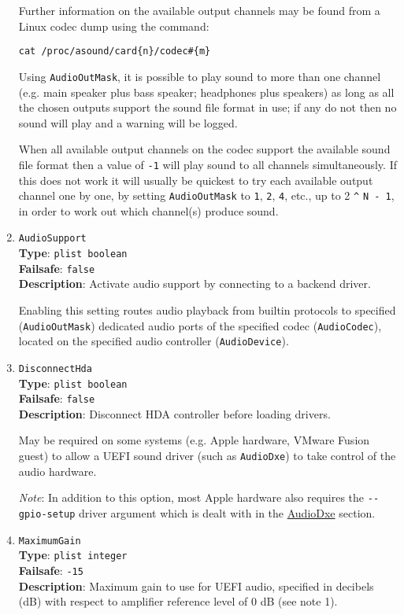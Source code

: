 \documentclass[]{article}
\begin{document}
\begin{enumerate}
  Further information on the available output channels may be found from a Linux codec dump using the command:
  
  \texttt{cat /proc/asound/card\{n\}/codec\#\{m\}}
  
  Using \texttt{AudioOutMask}, it is possible to play sound to more than one channel (e.g. main speaker plus bass speaker;
  headphones plus speakers) as long as all the chosen outputs support the sound file format in use; if any do not then no
  sound will play and a warning will be logged.

  When all available output channels on the codec support the available sound file format then a value
  of \texttt{-1} will play sound to all channels simultaneously. If this does not work it will usually be quickest
  to try each available output channel one by one, by setting \texttt{AudioOutMask} to \texttt{1}, \texttt{2},
  \texttt{4}, etc., up to 2 \texttt{\^{}} \texttt{N - 1}, in order to work out which channel(s) produce sound.

  \item
  \texttt{AudioSupport}\\
  \textbf{Type}: \texttt{plist\ boolean}\\
  \textbf{Failsafe}: \texttt{false}\\
  \textbf{Description}: Activate audio support by connecting to a backend driver.

  Enabling this setting routes audio playback from builtin protocols to specified
  (\texttt{AudioOutMask}) dedicated audio ports of the specified codec (\texttt{AudioCodec}),
  located on the specified audio controller (\texttt{AudioDevice}).

  \item
  \texttt{DisconnectHda}\\
  \textbf{Type}: \texttt{plist\ boolean}\\
  \textbf{Failsafe}: \texttt{false}\\
  \textbf{Description}: Disconnect HDA controller before loading drivers.

  May be required on some systems (e.g. Apple hardware, VMware Fusion guest) to allow
  a UEFI sound driver (such as \texttt{AudioDxe}) to take control of the audio hardware.

  \emph{Note}: In addition to this option, most Apple hardware also requires the
  \texttt{-{}-gpio-setup} driver argument which is dealt with in the
  \hyperref[uefiaudio]{AudioDxe} section.

  \item
  \texttt{MaximumGain}\\
  \textbf{Type}: \texttt{plist\ integer}\\
  \textbf{Failsafe}: \texttt{-15}\\
  \textbf{Description}: Maximum gain to use for UEFI audio, specified in decibels (dB) with respect to amplifier
  reference level of 0 dB (see note 1).


\end{enumerate}
\end{document}
